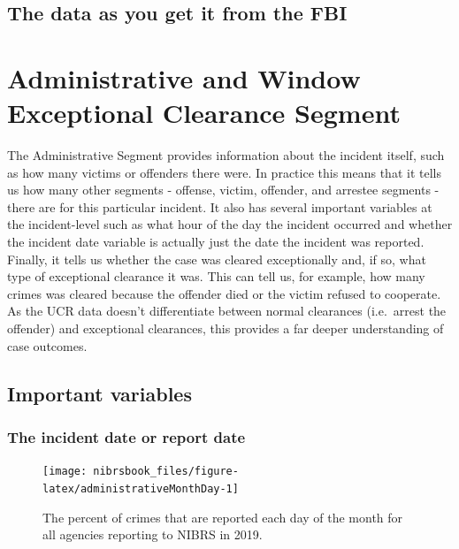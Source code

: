 \documentclass[
  12pt,
  openany]{book}
\begin{document}
\hypertarget{the-data-as-you-get-it-from-the-fbi}{%
\section{The data as you get it from the FBI}\label{the-data-as-you-get-it-from-the-fbi}}

\hypertarget{administrative-and-window-exceptional-clearance-segment}{%
\chapter{Administrative and Window Exceptional Clearance Segment}\label{administrative-and-window-exceptional-clearance-segment}}

The Administrative Segment provides information about the incident itself, such as how many victims or offenders there were. In practice this means that it tells us how many other segments - offense, victim, offender, and arrestee segments - there are for this particular incident. It also has several important variables at the incident-level such as what hour of the day the incident occurred and whether the incident date variable is actually just the date the incident was reported. Finally, it tells us whether the case was cleared exceptionally and, if so, what type of exceptional clearance it was. This can tell us, for example, how many crimes was cleared because the offender died or the victim refused to cooperate. As the UCR data doesn't differentiate between normal clearances (i.e.~arrest the offender) and exceptional clearances, this provides a far deeper understanding of case outcomes.

\hypertarget{important-variables}{%
\section{Important variables}\label{important-variables}}

\hypertarget{the-incident-date-or-report-date}{%
\subsection{The incident date or report date}\label{the-incident-date-or-report-date}}

\begin{figure}

{\centering \texttt{[image: nibrsbook\_files/figure-latex/administrativeMonthDay-1]} 

}

\caption{The percent of crimes that are reported each day of the month for all agencies reporting to NIBRS in 2019.}\label{fig:administrativeMonthDay}
\end{figure}
\end{document}
